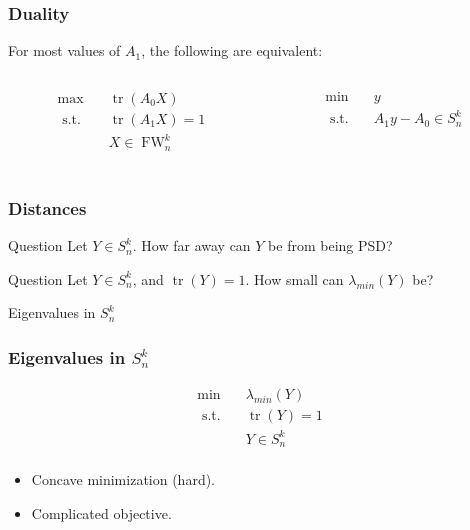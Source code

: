 \documentclass{beamer}
\DeclareMathOperator{\FW}{FW}
\DeclareMathOperator{\tr}{tr}
\newcommand{\st}{{\text{ s.t. }}}
\begin{document}
\begin{frame}
    \frametitle{Duality}
    For most values of $A_1$, the following are equivalent:
    \begin{columns}
        \begin{column}{0.5\textwidth}
            \begin{equation}
                \begin{aligned}
                    \max\quad & \tr(A_0X)\\
                    \st & \tr(A_1X) = 1\\
                        & X \in \FW^k_n\\
                \end{aligned}
            \end{equation}
        \end{column}
        \begin{column}{0.5\textwidth}
            \begin{equation}
                \begin{aligned}
                    \min\quad & y\\
                    \st & A_1y - A_0 \in S^k_n\\
                \end{aligned}
            \end{equation}
        \end{column}
    \end{columns}
\end{frame}
\begin{frame}
    \frametitle{Distances}
    \begin{block}{Question}
        Let $Y \in S^k_n$. How far away can $Y$ be from being PSD?
    \end{block}
    \pause
    \begin{block}{Question}
        Let $Y \in S^k_n$, and $\tr(Y)=1$. How small can $\lambda_{min}(Y)$ be?
    \end{block}
\end{frame}
\begin{frame}
    \centering
    \huge
    {\color{gray}Eigenvalues in $S^k_n$}
\end{frame}
\begin{frame}
    \frametitle{Eigenvalues in $S^k_n$}
    \begin{equation}
        \begin{aligned}
            \min\quad & \lambda_{min}(Y)\\
            \st & \tr(Y) = 1\\
                & Y \in S^k_n\\
        \end{aligned}
    \end{equation}
    \pause
    \begin{itemize}
        \item Concave minimization (hard).
        \pause
        \item Complicated objective.
    \end{itemize}
\end{frame}
\end{document}
